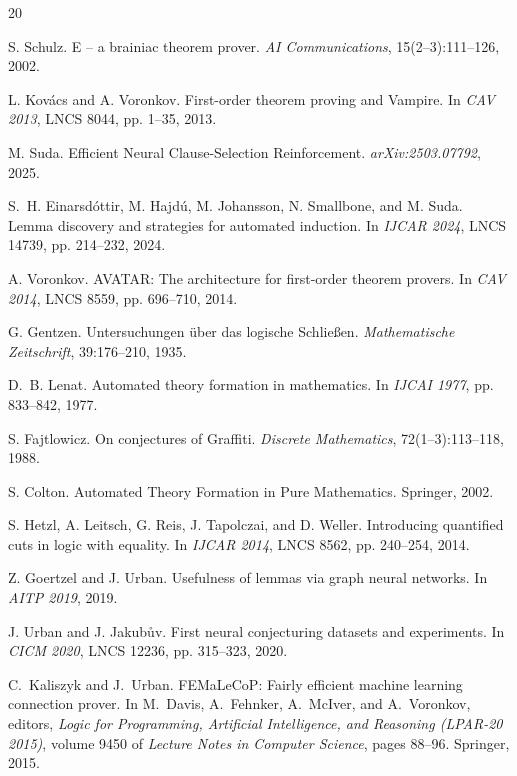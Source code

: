 \documentclass{easychair}
\begin{document}
\begin{thebibliography}{20}

S. Schulz.
\newblock E -- a brainiac theorem prover.
\newblock \emph{AI Communications}, 15(2--3):111--126, 2002.

L. Kov{\'a}cs and A. Voronkov.
\newblock First-order theorem proving and Vampire.
\newblock In \emph{CAV 2013}, LNCS 8044, pp. 1--35, 2013.


M. Suda.
\newblock Efficient Neural Clause-Selection Reinforcement.
\newblock \emph{arXiv:2503.07792}, 2025.

S.~H. Einarsd{\'o}ttir, M. Hajd{\'u}, M. Johansson, N. Smallbone, and M. Suda.
\newblock Lemma discovery and strategies for automated induction.
\newblock In \emph{IJCAR 2024}, LNCS 14739, pp. 214--232, 2024.

A. Voronkov.
\newblock AVATAR: The architecture for first-order theorem provers.
\newblock In \emph{CAV 2014}, LNCS 8559, pp. 696--710, 2014.

G. Gentzen.
\newblock Untersuchungen {\"u}ber das logische Schlie{\ss}en.
\newblock \emph{Mathematische Zeitschrift}, 39:176--210, 1935.

D.~B. Lenat.
\newblock Automated theory formation in mathematics.
\newblock In \emph{IJCAI 1977}, pp. 833--842, 1977.

S. Fajtlowicz.
\newblock On conjectures of {G}raffiti.
\newblock \emph{Discrete Mathematics}, 72(1--3):113--118, 1988.

S. Colton.
\newblock Automated Theory Formation in Pure Mathematics.
\newblock Springer, 2002.

S. Hetzl, A. Leitsch, G. Reis, J. Tapolczai, and D. Weller.
\newblock Introducing quantified cuts in logic with equality.
\newblock In \emph{IJCAR 2014}, LNCS 8562, pp. 240--254, 2014.

Z. Goertzel and J. Urban.
\newblock Usefulness of lemmas via graph neural networks.
\newblock In \emph{AITP 2019}, 2019.

J. Urban and J. Jakub\r{u}v.
\newblock First neural conjecturing datasets and experiments.
\newblock In \emph{CICM 2020}, LNCS 12236, pp. 315--323, 2020.

C.~Kaliszyk and J.~Urban.
\newblock FEMaLeCoP: Fairly efficient machine learning connection prover.
\newblock In M.~Davis, A.~Fehnker, A.~McIver, and A.~Voronkov, editors,
{\em Logic for Programming, Artificial Intelligence, and Reasoning
(LPAR-20 2015)},
volume 9450 of {\em Lecture Notes in Computer Science},
pages 88--96. Springer, 2015.


\end{thebibliography}
\end{document}
